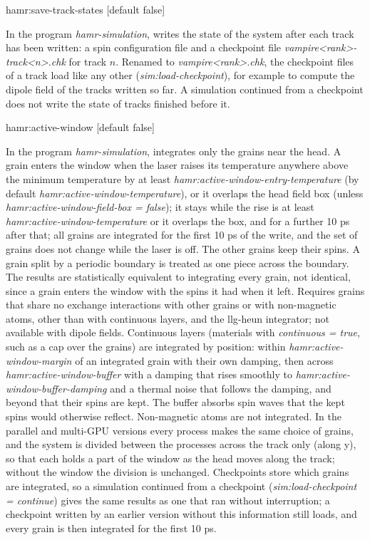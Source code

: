 {\zicf hamr:save-track-states [default false]}
In the program \textit{hamr-simulation}, writes the state of the system after each track has been written: a spin configuration file and a checkpoint file \textit{vampire<rank>-track<n>.chk} for track $n$. Renamed to \textit{vampire<rank>.chk}, the checkpoint files of a track load like any other (\textit{sim:load-checkpoint}), for example to compute the dipole field of the tracks written so far. A simulation continued from a checkpoint does not write the state of tracks finished before it.

{\zicf hamr:active-window [default false]}
In the program \textit{hamr-simulation}, integrates only the grains near the head. A grain enters the window when the laser raises its temperature anywhere above the minimum temperature by at least \textit{hamr:active-window-entry-temperature} (by default \textit{hamr:active-window-temperature}), or it overlaps the head field box (unless \textit{hamr:active-window-field-box = false}); it stays while the rise is at least \textit{hamr:active-window-temperature} or it overlaps the box, and for a further 10 ps after that; all grains are integrated for the first 10 ps of the write, and the set of grains does not change while the laser is off. The other grains keep their spins. A grain split by a periodic boundary is treated as one piece across the boundary. The results are statistically equivalent to integrating every grain, not identical, since a grain enters the window with the spins it had when it left. Requires grains that share no exchange interactions with other grains or with non-magnetic atoms, other than with continuous layers, and the llg-heun integrator; not available with dipole fields. Continuous layers (materials with \textit{continuous = true}, such as a cap over the grains) are integrated by position: within \textit{hamr:active-window-margin} of an integrated grain with their own damping, then across \textit{hamr:active-window-buffer} with a damping that rises smoothly to \textit{hamr:active-window-buffer-damping} and a thermal noise that follows the damping, and beyond that their spins are kept. The buffer absorbs spin waves that the kept spins would otherwise reflect. Non-magnetic atoms are not integrated. In the parallel and multi-GPU versions every process makes the same choice of grains, and the system is divided between the processes across the track only (along y), so that each holds a part of the window as the head moves along the track; without the window the division is unchanged. Checkpoints store which grains are integrated, so a simulation continued from a checkpoint (\textit{sim:load-checkpoint = continue}) gives the same results as one that ran without interruption; a checkpoint written by an earlier version without this information still loads, and every grain is then integrated for the first 10 ps.


